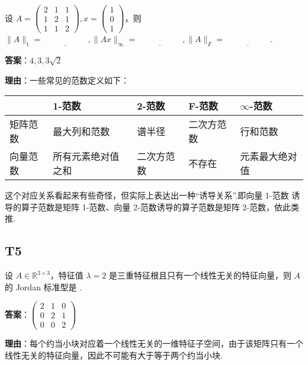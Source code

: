 \documentclass{article}
\begin{document}
\par 设 $A=\begin{pmatrix}
	2 & 1 & 1\\
	1 & 2 & 1\\
	1 & 1 & 2
\end{pmatrix}, x=\begin{pmatrix}
	1\\0\\1
\end{pmatrix}$，则 $\|A\|_1=\underline{\phantom{empty\_space}}, \|Ax\|_{\infty}=\underline{\phantom{empty\_space}}, \|A\|_F=\underline{\phantom{empty\_space}}$.

\par \textbf{答案}：$4, 3, 3\sqrt 2$

\par \textbf{理由}：一些常见的范数定义如下：

\begin{tabularx}{\linewidth}{|X|X|X|X|X|} 
	\hline
	 & 1-范数 & 2-范数 & F-范数 & $\infty$-范数 \\ 
	\hline
	矩阵范数 & 最大列和范数 & 谱半径 & 二次方范数 & 行和范数 \\ 
	\hline
	向量范数 & 所有元素绝对值之和 & 二次方范数 & 不存在 & 元素最大绝对值 \\ 
	\hline
\end{tabularx}

\par 这个对应关系看起来有些奇怪，但实际上表达出一种“诱导关系”.即向量 1-范数 诱导的算子范数是矩阵 1-范数、向量 2-范数诱导的算子范数是矩阵 2-范数，依此类推.

\subsection{T5}

\par 设 $A\in \mathbb R^{3\times 3}$，特征值 $\lambda=2$ 是三重特征根且只有一个线性无关的特征向量，则 $A$ 的 Jordan 标准型是 \underline{\phantom{empty\_space}}.

\par\textbf{答案}：$\begin{pmatrix}
	2 & 1 & 0\\
	0 & 2 & 1\\
	0 & 0 & 2
\end{pmatrix}$

\par \textbf{理由}：每个约当小块对应着一个线性无关的一维特征子空间，由于该矩阵只有一个线性无关的特征向量，因此不可能有大于等于两个约当小块.
\end{document}
